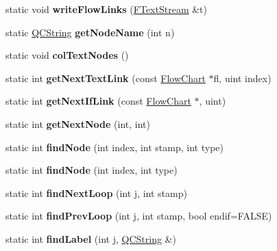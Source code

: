 \begin{DoxyCompactItemize}
static void {\bfseries write\+Flow\+Links} (\mbox{\hyperlink{class_f_text_stream}{F\+Text\+Stream}} \&t)
\item 
\mbox{\label{class_flow_chart_aa01a87c51143a53315d534acc1340693}} 
static \mbox{\hyperlink{class_q_c_string}{Q\+C\+String}} {\bfseries get\+Node\+Name} (int n)
\item 
\mbox{\label{class_flow_chart_a6fc7dfce3416355a82991f015431b854}} 
static void {\bfseries col\+Text\+Nodes} ()
\item 
\mbox{\label{class_flow_chart_afbabb1015cce9beed9ff096f9cf91f5a}} 
static int {\bfseries get\+Next\+Text\+Link} (const \mbox{\hyperlink{class_flow_chart}{Flow\+Chart}} $\ast$fl, uint index)
\item 
\mbox{\label{class_flow_chart_a5b569cff427ed07284b8a712775df4c9}} 
static int {\bfseries get\+Next\+If\+Link} (const \mbox{\hyperlink{class_flow_chart}{Flow\+Chart}} $\ast$, uint)
\item 
\mbox{\label{class_flow_chart_a640c488456976d684b1eddedf05a42d2}} 
static int {\bfseries get\+Next\+Node} (int, int)
\item 
\mbox{\label{class_flow_chart_a72b7f05a1b0f8638799d039df1d8b1ed}} 
static int {\bfseries find\+Node} (int index, int stamp, int type)
\item 
\mbox{\label{class_flow_chart_a51740512cf2ac6cb8011bd99438bffc7}} 
static int {\bfseries find\+Node} (int index, int type)
\item 
\mbox{\label{class_flow_chart_a2d2e047c2e013947c1d61b4c61bd9e54}} 
static int {\bfseries find\+Next\+Loop} (int j, int stamp)
\item 
\mbox{\label{class_flow_chart_a1dec94e1f2202f648d696b1d68b1f9c9}} 
static int {\bfseries find\+Prev\+Loop} (int j, int stamp, bool endif=F\+A\+L\+SE)
\item 
\mbox{\label{class_flow_chart_a4c13c6501c1d5ce82db5fdc7007582d6}} 
static int {\bfseries find\+Label} (int j, \mbox{\hyperlink{class_q_c_string}{Q\+C\+String}} \&)

\end{DoxyCompactItemize}
